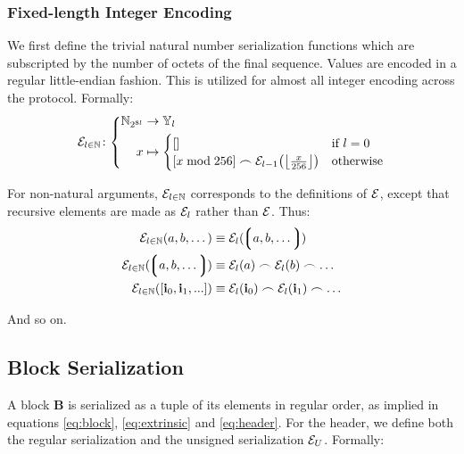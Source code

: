 \subsubsection{Fixed-length Integer Encoding}
We first define the trivial natural number serialization functions which are subscripted by the number of octets of the final sequence. Values are encoded in a regular little-endian fashion. This is utilized for almost all integer encoding across the protocol. Formally:
\begin{equation}
  \se_{l \in \N}\colon\left\{\begin{aligned}
    \N_{2^{8l}} &\to \blob_l \\
    x &\mapsto \begin{cases}
      [] &\when l = 0 \\
      [x \bmod 256] \concat \se_{l - 1}\left(\left\lfloor \frac{x}{256} \right\rfloor\right) &\otherwise
    \end{cases}
  \end{aligned}\right.
\end{equation}

For non-natural arguments, $\mathcal{E}_{l \in \mathbb{N}}$ corresponds to the definitions of $\mathcal{E}$, except that recursive elements are made as $\mathcal{E}_l$ rather than $\mathcal{E}$. Thus:
\begin{align}
  \se_{l \in \N}(a, b, \dots) &\equiv \se_l(\tup{a, b, \dots})\\
  \se_{l \in \N}(\tup{a, b, \dots}) &\equiv \se_l(a) \concat \se_l(b) \concat \dots\\
  \se_{l \in \N}([\mathbf{i}_0, \mathbf{i}_1, ...]) &\equiv \se_l(\mathbf{i}_0) \concat \se_l(\mathbf{i}_1) \concat \dots
\end{align}

And so on.

\subsection{Block Serialization}

A block $\mathbf{B}$ is serialized as a tuple of its elements in regular order, as implied in equations \ref{eq:block}, \ref{eq:extrinsic} and \ref{eq:header}. For the header, we define both the regular serialization and the unsigned serialization $\mathcal{E}_U$. Formally:

